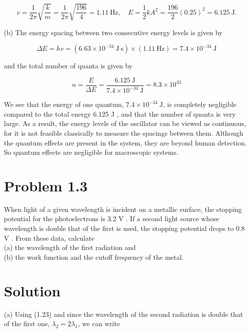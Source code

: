 \documentclass[10pt]{article}
\begin{document}
\begin{equation*}
v=\frac{1}{2 \pi} \sqrt{\frac{k}{m}}=\frac{1}{2 \pi} \sqrt{\frac{196}{4}}=1.11 \mathrm{~Hz}, \quad E=\frac{1}{2} k A^{2}=\frac{196}{2}(0.25)^{2}=6.125 \mathrm{~J} . \tag{1.159}
\end{equation*}


(b) The energy spacing between two consecutive energy levels is given by


\begin{equation*}
\Delta E=h v=\left(6.63 \times 10^{-34} \mathrm{~J} \mathrm{~s}\right) \times(1.11 \mathrm{~Hz})=7.4 \times 10^{-34} \mathrm{~J} \tag{1.160}
\end{equation*}


and the total number of quanta is given by


\begin{equation*}
n=\frac{E}{\Delta E}=\frac{6.125 \mathrm{~J}}{7.4 \times 10^{-34} \mathrm{~J}}=8.3 \times 10^{33} \tag{1.161}
\end{equation*}


We see that the energy of one quantum, $7.4 \times 10^{-34} \mathrm{~J}$, is completely negligible compared to the total energy 6.125 J , and that the number of quanta is very large. As a result, the energy levels of the oscillator can be viewed as continuous, for it is not feasible classically to measure the spacings between them. Although the quantum effects are present in the system, they are beyond human detection. So quantum effects are negligible for macroscopic systems.

\section*{Problem 1.3}
When light of a given wavelength is incident on a metallic surface, the stopping potential for the photoelectrons is 3.2 V . If a second light source whose wavelength is double that of the first is used, the stopping potential drops to 0.8 V . From these data, calculate\\
(a) the wavelength of the first radiation and\\
(b) the work function and the cutoff frequency of the metal.

\section*{Solution}
(a) Using (1.23) and since the wavelength of the second radiation is double that of the first one, $\lambda_{2}=2 \lambda_{1}$, we can write
\end{document}
